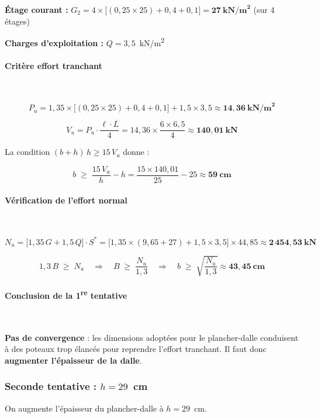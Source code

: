 \textbf{Étage courant :} $G_2 = 4 \times \big[(0{,}25 \times 25) + 0{,}4 + 0{,}1\big] = \mathbf{27~\text{kN/m}^2}$ (sur 4 étages)

\textbf{Charges d'exploitation :} $Q = 3{,}5$~kN/m\textsuperscript{2}

\paragraph{Critère effort tranchant}~

\[
P_u = 1{,}35 \times \big[(0{,}25 \times 25) + 0{,}4 + 0{,}1\big] + 1{,}5 \times 3{,}5 \approx \mathbf{14{,}36~\text{kN/m}^2}
\]

\[
V_u = P_u \cdot \frac{\ell \cdot L}{4} = 14{,}36 \times \frac{6 \times 6{,}5}{4} \approx \mathbf{140{,}01~\text{kN}}
\]

La condition $(b + h) \, h \geq 15 \, V_u$ donne :

\[
b \;\geq\; \frac{15 \, V_u}{h} - h = \frac{15 \times 140{,}01}{25} - 25 \approx \mathbf{59~\text{cm}}
\]

\paragraph{Vérification de l'effort normal}~

\[
N_u = \big[1{,}35 \, G + 1{,}5 \, Q\big] \cdot S^* = \big[1{,}35 \times (9{,}65 + 27) + 1{,}5 \times 3{,}5\big] \times 44{,}85 \approx \mathbf{2\,454{,}53~\text{kN}}
\]

\[
1{,}3 \, B \;\geq\; N_u \quad\Longrightarrow\quad B \;\geq\; \frac{N_u}{1{,}3} \quad\Longrightarrow\quad b \;\geq\; \sqrt{\frac{N_u}{1{,}3}} \approx \mathbf{43{,}45~\text{cm}}
\]

\paragraph{Conclusion de la 1\textsuperscript{re} tentative}~

\textbf{Pas de convergence} : les dimensions adoptées pour le plancher-dalle conduisent à des poteaux trop élancés pour reprendre l'effort tranchant. Il faut donc \textbf{augmenter l'épaisseur de la dalle}.

\subsubsection{Seconde tentative : \texorpdfstring{$h = 29$}{h = 29}~cm}

On augmente l'épaisseur du plancher-dalle à $h = 29$~cm.

